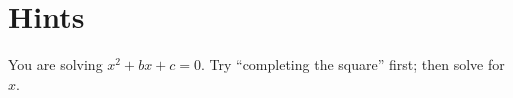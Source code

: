 \chapter{Hints}
\label{chapter:Hints}
\thispagestyle{empty}

\begin{hint*}\label{hint:thm:MonicQuadratic}
You are solving $x^2+bx+c = 0$. Try ``completing the square'' first; then solve for $x$.
\end{hint*}
